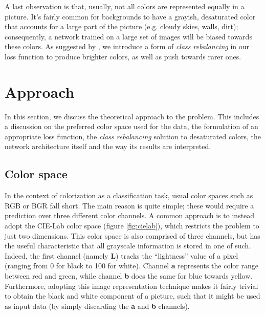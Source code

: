 \documentclass[twoside,twocolumn]{article}
\begin{document}
A last observation is that, usually, not all colors are represented equally in a picture. It’s fairly common for backgrounds to have a grayish, desaturated color that accounts for a large part of the picture (e.g. cloudy skies, walls, dirt); consequently, a network trained on a large set of images will be biased towards these colors. As suggested by  \cite{Zhang:2016}, we introduce a form of \textit{class rebalancing} in our loss function to produce brighter colors, as well as push towards rarer ones.

\newpage



\section{Approach}
In this section, we discuss the theoretical approach to the problem. This includes a discussion on the preferred color space used for the data, the formulation of an appropriate loss function, the \textit{class rebalancing} solution to desaturated colors, the network architecture itself and the way its results are interpreted.


\subsection{Color space}
In the context of colorization as a classification task, usual color spaces such as RGB or BGR fall short. The main reason is quite simple; these would require a prediction over three different color channels. A common approach is to instead adopt the CIE-Lab color space (figure \ref{fig:cielab}), which restricts the problem to just two dimensions. This color space is also comprised of three channels, but has the useful characteristic that all grayscale information is stored in one of such. Indeed, the first channel (namely \textbf{L}) tracks the “lightness” value of a pixel (ranging from 0 for black to 100 for white). Channel \textbf{a} represents the color range between red and green, while channel \textbf{b} does the same for blue towards yellow. Furthermore, adopting this image representation technique makes it fairly trivial to obtain the black and white component of a picture, such that it might be used as input data (by simply discarding the \textbf{a} and \textbf{b} channels).
\end{document}
